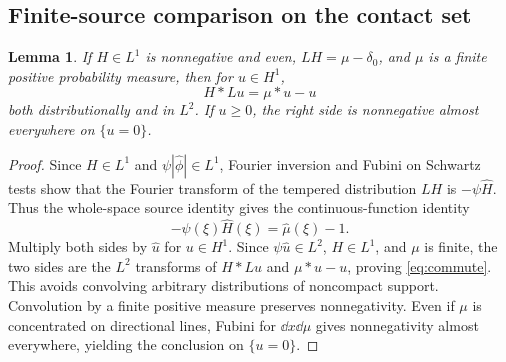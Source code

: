 \documentclass[11pt,a4paper]{article}
\newtheorem{lemma}[theorem]{Lemma}
\theoremstyle{remark}\newtheorem{remark}[theorem]{Remark}
\newcommand{\1}{\mathbf1}\newcommand{\pos}[1]{(#1)_+}
\begin{document}
\subsection{Finite-source comparison on the contact set}
\begin{lemma}\label{lem:finite-source}
If $H\in L^1$ is nonnegative and even, $LH=\mu-\delta_0$, and $\mu$ is a finite positive probability measure, then for $u\in H^1$,
\begin{equation}\label{eq:commute}
 H*Lu=\mu*u-u
\end{equation}
both distributionally and in $L^2$. If $u\ge0$, the right side is nonnegative almost everywhere on $\{u=0\}$.
\end{lemma}
\begin{proof}
Since $H\in L^1$ and $\psi|\widehat\phi|\in L^1$, Fourier inversion and Fubini on Schwartz tests show that the Fourier transform of the tempered distribution $LH$ is $-\psi\widehat H$. Thus the whole-space source identity gives the continuous-function identity
\[
 -\psi(\xi)\widehat H(\xi)=\widehat\mu(\xi)-1.
\]
Multiply both sides by $\widehat u$ for $u\in H^1$. Since $\psi\widehat u\in L^2$, $H\in L^1$, and $\mu$ is finite, the two sides are the $L^2$ transforms of $H*Lu$ and $\mu*u-u$, proving \eqref{eq:commute}. This avoids convolving arbitrary distributions of noncompact support. Convolution by a finite positive measure preserves nonnegativity. Even if $\mu$ is concentrated on directional lines, Fubini for $\dd x\dd\mu$ gives nonnegativity almost everywhere, yielding the conclusion on $\{u=0\}$.
\end{proof}
\end{document}

